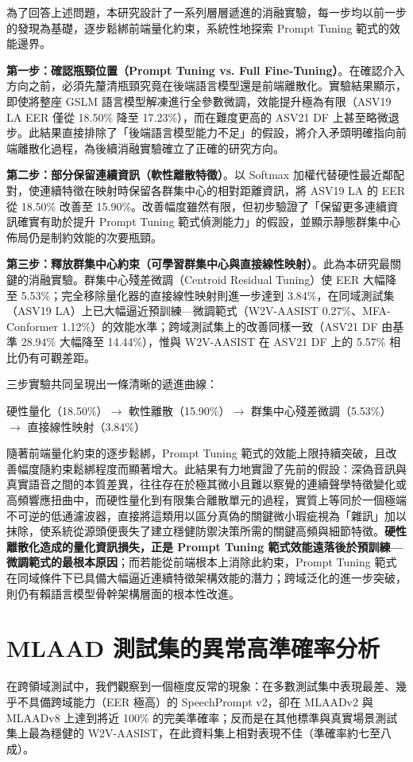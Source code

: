 為了回答上述問題，本研究設計了一系列層層遞進的消融實驗，每一步均以前一步的發現為基礎，逐步鬆綁前端量化約束，系統性地探索 Prompt Tuning 範式的效能邊界。

\textbf{第一步：確認瓶頸位置（Prompt Tuning vs. Full Fine-Tuning）}。在確認介入方向之前，必須先釐清瓶頸究竟在後端語言模型還是前端離散化。實驗結果顯示，即使將整座 GSLM 語言模型解凍進行全參數微調，效能提升極為有限（ASV19 LA EER 僅從 18.50\% 降至 17.23\%），而在難度更高的 ASV21 DF 上甚至略微退步。此結果直接排除了「後端語言模型能力不足」的假設，將介入矛頭明確指向前端離散化過程，為後續消融實驗確立了正確的研究方向。

\textbf{第二步：部分保留連續資訊（軟性離散特徵）}。以 Softmax 加權代替硬性最近鄰配對，使連續特徵在映射時保留各群集中心的相對距離資訊，將 ASV19 LA 的 EER 從 18.50\% 改善至 15.90\%。改善幅度雖然有限，但初步驗證了「保留更多連續資訊確實有助於提升 Prompt Tuning 範式偵測能力」的假設，並顯示靜態群集中心佈局仍是制約效能的次要瓶頸。

\textbf{第三步：釋放群集中心約束（可學習群集中心與直接線性映射）}。此為本研究最關鍵的消融實驗。群集中心殘差微調（Centroid Residual Tuning）使 EER 大幅降至 5.53\%；完全移除量化器的直接線性映射則進一步達到 3.84\%，在同域測試集（ASV19 LA）上已大幅逼近預訓練—微調範式（W2V-AASIST 0.27\%、MFA-Conformer 1.12\%）的效能水準；跨域測試集上的改善同樣一致（ASV21 DF 由基準 28.94\% 大幅降至 14.44\%），惟與 W2V-AASIST 在 ASV21 DF 上的 5.57\% 相比仍有可觀差距。

三步實驗共同呈現出一條清晰的遞進曲線：
\begin{center}
硬性量化（18.50\%）$\rightarrow$ 軟性離散（15.90\%）$\rightarrow$ 群集中心殘差微調（5.53\%）$\rightarrow$ 直接線性映射（3.84\%）
\end{center}
隨著前端量化約束的逐步鬆綁，Prompt Tuning 範式的效能上限持續突破，且改善幅度隨約束鬆綁程度而顯著增大。此結果有力地實證了先前的假設：深偽音訊與真實語音之間的本質差異，往往存在於極其微小且難以察覺的連續聲學特徵變化或高頻響應扭曲中，而硬性量化到有限集合離散單元的過程，實質上等同於一個極端不可逆的低通濾波器，直接將這類用以區分真偽的關鍵微小瑕疵視為「雜訊」加以抹除，使系統從源頭便喪失了建立穩健防禦決策所需的關鍵高頻與細節特徵。\textbf{硬性離散化造成的量化資訊損失，正是 Prompt Tuning 範式效能遠落後於預訓練—微調範式的最根本原因}；而若能從前端根本上消除此約束，Prompt Tuning 範式在同域條件下已具備大幅逼近連續特徵架構效能的潛力；跨域泛化的進一步突破，則仍有賴語言模型骨幹架構層面的根本性改進。

\section{MLAAD 測試集的異常高準確率分析}
\label{sec:concl_mlaad}
在跨領域測試中，我們觀察到一個極度反常的現象：在多數測試集中表現最差、幾乎不具備跨域能力（EER 極高）的 SpeechPrompt v2，卻在 MLAADv2 與 MLAADv8 上達到將近 100\% 的完美準確率；反而是在其他標準與真實場景測試集上最為穩健的 W2V-AASIST，在此資料集上相對表現不佳（準確率約七至八成）。


